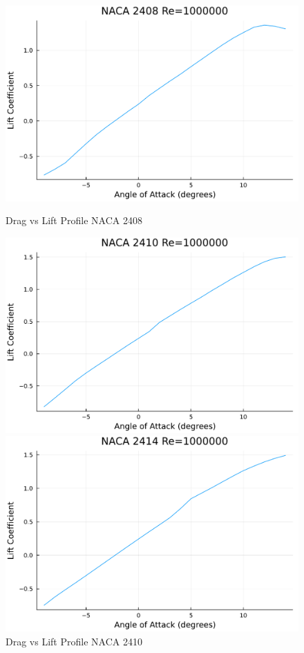 \documentclass{article}
\begin{document}
\begin{figure}[h]
    \centering
\begin{minipage}[b]{0.32\textwidth}
\centering
\includegraphics[width=\textwidth]{NACA 2408 Re=1000000_Lift_Coefficent_Plot.pdf}
\caption{\label{fig:NACA 2408 Lift}Drag vs Lift Profile NACA 2408}
\end{minipage}
\begin{minipage}[b]{0.32\textwidth}
\centering
\includegraphics[width=\textwidth]{NACA 2410 Re=1000000_Lift_Coefficent_Plot.pdf}
\caption{\label{fig:NACA 2410 Lift}Drag vs Lift Profile NACA 2410}
\end{minipage}
\begin{minipage}[b]{0.32\textwidth}
\centering
\includegraphics[width=\textwidth]{NACA 2414 Re=1000000_Lift_Coefficent_Plot.pdf}

\end{minipage}
\end{figure}
\end{document}
